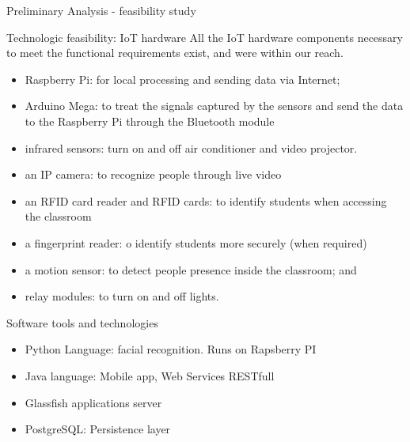 \documentclass[notes=show, 10pt]{beamer}
\begin{document}
    \begin{frame}{Preliminary Analysis - feasibility study}
        \begin{block}{Technologic feasibility: IoT hardware}
            All the IoT hardware components necessary to meet the functional requirements exist, and were within our reach.\\
            \begin{itemize}
                \item Raspberry Pi: for local processing and sending data via Internet;
                \item Arduino Mega: to treat the signals captured by the sensors and send the data to the Raspberry Pi through the Bluetooth module
                \item infrared sensors: turn on and off air conditioner and video projector.
                \item an IP camera: to recognize people through live video
                \item an RFID card reader and RFID cards: to identify students when accessing the classroom
                \item a fingerprint reader: o identify students more securely (when required)
                \item a motion sensor: to detect people presence inside the classroom; and
                \item relay modules: to turn on and off lights.
            \end{itemize}
           
        \end{block}
    \end{frame}
    
    \begin{frame}{Software tools and technologies}
            \begin{itemize}
                \item Python Language: facial recognition. Runs on Rapsberry PI
                \item Java language: Mobile app, Web Services RESTfull
                \item Glassfish applications server
                \item PostgreSQL: Persistence layer
            \end{itemize}
    \end{frame}
    
\end{document}
